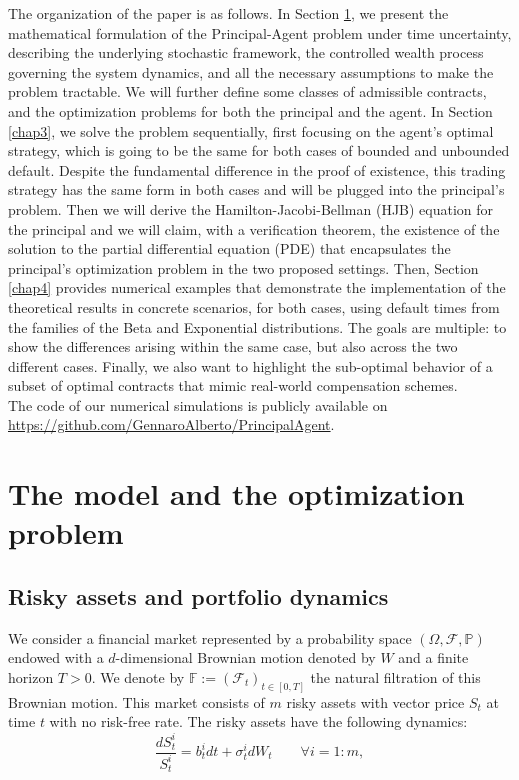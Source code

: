 \documentclass[11pt,a4paper]{article}
\theoremstyle{thmstyleone}%
\theoremstyle{thmstyletwo}%
\theoremstyle{thmstylethree}%
\begin{document}
The organization of the paper is as follows. In Section \ref{chap2}, we present the mathematical formulation of the Principal-Agent problem under time uncertainty, describing the underlying stochastic framework, the controlled wealth process governing the system dynamics, and all the necessary assumptions to make the problem tractable. We will further define some classes of admissible contracts, and the optimization problems for both the principal and the agent. In Section \ref{chap3}, we solve the problem sequentially, first focusing on the agent’s optimal strategy, which is going to be the same for both cases of bounded and unbounded default. Despite the fundamental difference in the proof of existence, this trading strategy has the same form in both cases and will be plugged into the principal's problem. Then we will derive the Hamilton-Jacobi-Bellman (HJB) equation for the principal and we will claim, with a verification theorem, the existence of the solution to the partial differential equation (PDE) that encapsulates the principal’s optimization problem in the two proposed settings. Then, Section \ref{chap4} provides numerical examples that demonstrate the implementation of the theoretical results in concrete scenarios, for both cases, using default times from the families of the Beta and Exponential distributions. The goals are multiple: to show the differences arising within the same case, but also across the two different cases. Finally, we also want to highlight the sub-optimal behavior of a subset of optimal contracts that mimic real-world compensation schemes.\\

The code of our numerical simulations is publicly available on \url{https://github.com/GennaroAlberto/PrincipalAgent}.

\section{The model and the optimization problem}\label{chap2}


\subsection{Risky assets and portfolio dynamics}
We consider a financial market represented by a probability space $(\Omega,\mathcal F,\mathbb P)$ endowed with a $d$-dimensional Brownian motion denoted by $W$ and a finite horizon $T>0$. We denote by $\mathbb F:=(\mathcal F_t)_{t\in[0, T]}$ the natural filtration of this Brownian motion. This market consists of $m$ risky assets with vector price $S_t$ at time $t$ with no risk-free rate. The risky assets have the following dynamics:
\begin{equation*}
    \frac{dS_t^i}{S_t^i} = b^i_t dt + \sigma^i_t dW_t \qquad \forall i = 1: m, 
\end{equation*}
\end{document}
